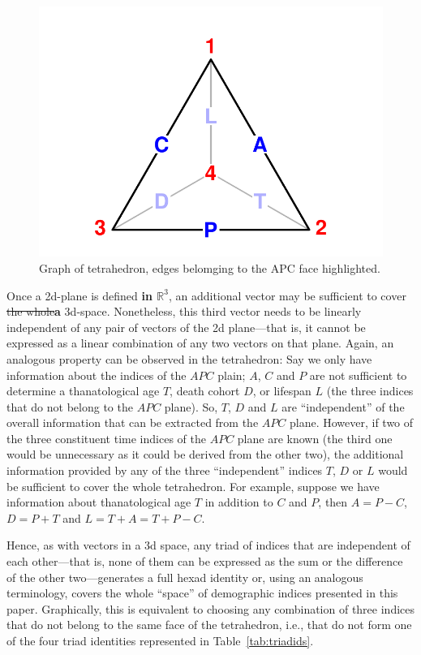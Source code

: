 \documentclass[11pt,oneside,a4paper]{article} %
\begin{document}
\begin{figure}[h!]
\centering
\caption{Graph of tetrahedron, edges belomging to the APC face highlighted.}
\label{fig:tet4vert1}
\includegraphics[scale=1]{Figures/tet4vert1New.pdf}
\end{figure}
\noindent 

Once a 2d-plane is defined \textbf{in $\mathbb{R}^3$}, an additional vector may be sufficient to cover \sout{the whole}\textbf{a} 
3d-space. Nonetheless, this third vector needs to be linearly independent
of any pair of vectors of the 2d plane---that is, it cannot be expressed as a
linear combination of any two vectors on that plane. Again, an analogous
property can be observed in the tetrahedron: Say we only have information about the indices of the $APC$ plain; $A$, $C$ and $P$ are not sufficient to determine a thanatological age $T$, death cohort $D$, or lifespan $L$ (the three indices that do not belong to the $APC$ plane). So, $T$, $D$ and $L$ are ``independent'' of the overall information that can be extracted from the $APC$ plane. However, if two of the three constituent time indices of the $APC$ plane are known (the third one would be unnecessary as it could be derived from the other two), the additional information provided by any of the three ``independent'' indices $T$, $D$ or $L$ would be sufficient to cover the whole tetrahedron. For example, suppose we have information about thanatological age $T$ in addition to $C$ and $P$, then
$A=P-C$, $D=P+T$ and $L=T+A=T+P-C$. 

Hence, as with vectors in a 3d space, any
triad of indices that are independent of each other---that is, none of them can
be expressed as the sum or the difference of the other two---generates a full
hexad identity or, using an analogous terminology, covers the whole ``space'' of
demographic indices presented in this paper. Graphically, this is equivalent to
choosing any combination of three indices that do not belong to the same face
of the tetrahedron, i.e., that do not form one of the four triad identities
represented in Table~\ref{tab:triadids}.
\end{document}
